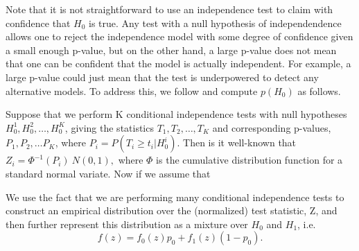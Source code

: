 \documentclass{article} %
\begin{document}
Note that it is not straightforward to use an independence test to claim with confidence that $H_0$ is true.  Any test with a null hypothesis of independendence allows one to reject the independence model with some degree of confidence given a small enough p-value, but on the other hand, a large p-value does not mean that one can be confident that the model is actually independent.  For example, a large p-value could just mean that the test is underpowered to detect any alternative models.  To address this, we follow \cite{efron2004large} and compute $p(H_0)$ as follows.

Suppose that we perform K conditional independence tests with null hypotheses $H_0^1, H_0^2, \ldots, H_0^K$, giving the statistics $T_1, T_2, \ldots, T_K$ and corresponding p-values, $P_1, P_2, \ldots P_K$, where $P_i = P(T_i \geq t_i | H_0^i)$.  Then is it well-known that $Z_i = \Phi^{-1}(P_i) ~ N(0,1),$ where $\Phi$ is the cumulative distribution function for a standard normal variate.  Now if we assume that 

We use the fact that we are performing many conditional independence tests to construct an empirical distribution over the (normalized) test statistic, Z, and then further represent this distribution as a mixture over $H_0$ and $H_1$, i.e. $$f(z) = f_0(z)p_0 + f_1(z)(1 - p_0).$$






\begin{small}

%
%

\end{small}
\end{document}
